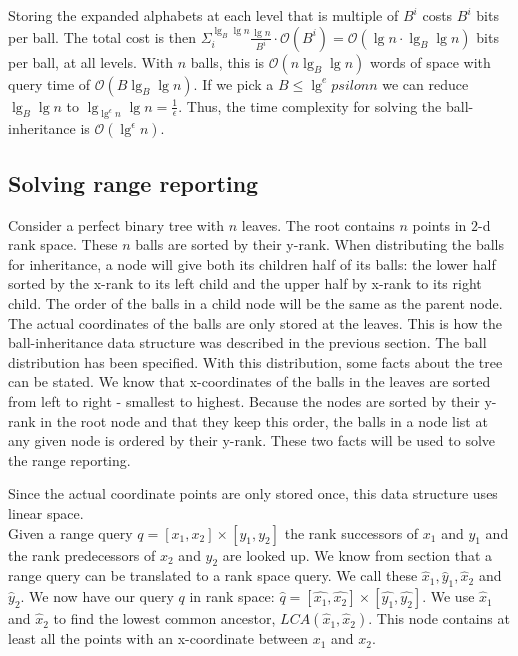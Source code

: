 Storing the expanded alphabets at each level that is multiple of $B^i$ costs $B^i$ bits per ball. The total cost is then $\Sigma^{\lg_B \lg n}_i \frac{\lg n}{B^i} \cdot \mathcal{O}(B^i) = \mathcal{O}(\lg n \cdot \lg_B \lg n)$ bits per ball, at all levels. With $n$ balls, this is $\mathcal{O}(n \lg_B \lg n)$ words of space with query time of $\mathcal{O}(B \lg_B \lg n)$. If we pick a $B \leq \lg^epsilon n$ we can reduce $\lg_B \lg n$ to $\lg_{\lg^\epsilon n} \lg n = \frac{1}{\epsilon}$. Thus, the time complexity for solving the ball-inheritance is $\mathcal{O}(\lg^\epsilon n)$. 



\subsection{Solving range reporting}

Consider a perfect binary tree with $n$ leaves. The root contains $n$ points in $2$-d rank space. These $n$ balls are sorted by their y-rank. When distributing the balls for inheritance, a node will give both its children half of its balls: the lower half sorted by the x-rank to its left child and the upper half by x-rank to its right child. The order of the balls in a child node will be the same as the parent node. The actual coordinates of the balls are only stored at the leaves. This is how the ball-inheritance data structure was described in the previous section. The ball distribution has been specified. With this distribution, some facts about the tree can be stated. We know that x-coordinates of the balls in the leaves are sorted from left to right - smallest to highest. Because the nodes are sorted by their y-rank in the root node and that they keep this order, the balls in a node list at any given node is ordered by their y-rank. These two facts will be used to solve the range reporting.

Since the actual coordinate points are only stored once, this data structure uses linear space. \\

Given a range query $q = [x_1, x_2] \times [y_1, y_2]$ the rank successors of $x_1$ and $y_1$ and the rank predecessors of $x_2$ and $y_2$ are looked up. We know from section  that a range query can be translated to a rank space query. We call these $\hat{x}_1, \hat{y}_1, \hat{x}_2$ and $\hat{y}_2$. We now have our query $q$ in rank space: $\hat{q} = [\hat{x_1}, \hat{x_2}] \times [\hat{y_1}, \hat{y_2}]$. We use $\hat{x}_1$ and $\hat{x}_2$ to find the lowest common ancestor, $LCA(\hat{x}_1, \hat{x}_2)$. This node contains at least all the points with an x-coordinate between $x_1$ and $x_2$. \\

